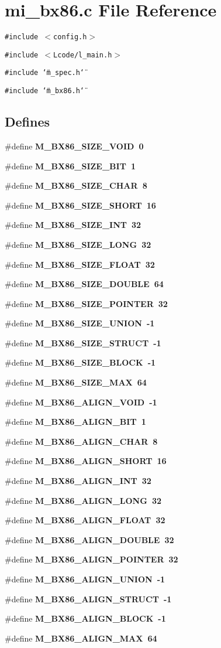 \section{mi\_\-bx86.c File Reference}
\label{mi__bx86_8c}
{\tt \#include $<$config.h$>$}\par
{\tt \#include $<$Lcode/l\_\-main.h$>$}\par
{\tt \#include \char`\"{}m\_\-spec.h\char`\"{}}\par
{\tt \#include \char`\"{}m\_\-bx86.h\char`\"{}}\par
\subsection*{Defines}
\begin{CompactItemize}
\item 
\#define \bf{M\_\-BX86\_\-SIZE\_\-VOID}~0
\item 
\#define \bf{M\_\-BX86\_\-SIZE\_\-BIT}~1
\item 
\#define \bf{M\_\-BX86\_\-SIZE\_\-CHAR}~8
\item 
\#define \bf{M\_\-BX86\_\-SIZE\_\-SHORT}~16
\item 
\#define \bf{M\_\-BX86\_\-SIZE\_\-INT}~32
\item 
\#define \bf{M\_\-BX86\_\-SIZE\_\-LONG}~32
\item 
\#define \bf{M\_\-BX86\_\-SIZE\_\-FLOAT}~32
\item 
\#define \bf{M\_\-BX86\_\-SIZE\_\-DOUBLE}~64
\item 
\#define \bf{M\_\-BX86\_\-SIZE\_\-POINTER}~32
\item 
\#define \bf{M\_\-BX86\_\-SIZE\_\-UNION}~-1
\item 
\#define \bf{M\_\-BX86\_\-SIZE\_\-STRUCT}~-1
\item 
\#define \bf{M\_\-BX86\_\-SIZE\_\-BLOCK}~-1
\item 
\#define \bf{M\_\-BX86\_\-SIZE\_\-MAX}~64
\item 
\#define \bf{M\_\-BX86\_\-ALIGN\_\-VOID}~-1
\item 
\#define \bf{M\_\-BX86\_\-ALIGN\_\-BIT}~1
\item 
\#define \bf{M\_\-BX86\_\-ALIGN\_\-CHAR}~8
\item 
\#define \bf{M\_\-BX86\_\-ALIGN\_\-SHORT}~16
\item 
\#define \bf{M\_\-BX86\_\-ALIGN\_\-INT}~32
\item 
\#define \bf{M\_\-BX86\_\-ALIGN\_\-LONG}~32
\item 
\#define \bf{M\_\-BX86\_\-ALIGN\_\-FLOAT}~32
\item 
\#define \bf{M\_\-BX86\_\-ALIGN\_\-DOUBLE}~32
\item 
\#define \bf{M\_\-BX86\_\-ALIGN\_\-POINTER}~32
\item 
\#define \bf{M\_\-BX86\_\-ALIGN\_\-UNION}~-1
\item 
\#define \bf{M\_\-BX86\_\-ALIGN\_\-STRUCT}~-1
\item 
\#define \bf{M\_\-BX86\_\-ALIGN\_\-BLOCK}~-1
\item 
\#define \bf{M\_\-BX86\_\-ALIGN\_\-MAX}~64
\end{CompactItemize}
